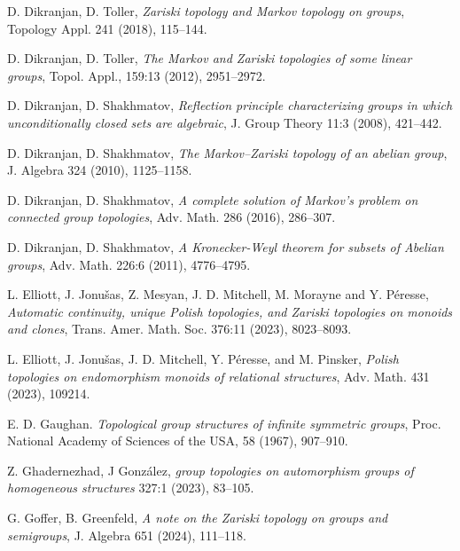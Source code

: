 \documentclass[11pt]{amsart}
\theoremstyle{definition}
\begin{document}
\begin{thebibliography}{}
D. Dikranjan, D. Toller, {\em Zariski topology and Markov topology on groups}, Topology Appl. 241 (2018), 115--144.

D. Dikranjan, D. Toller,
{\em The Markov and Zariski topologies of some linear groups},
Topol. Appl., 159:13 (2012), 2951--2972.

D. Dikranjan, D. Shakhmatov, {\em Reflection principle characterizing groups in which unconditionally closed sets are algebraic}, J. Group Theory 11:3 (2008), 421--442.

D. Dikranjan, D. Shakhmatov, {\em The Markov–Zariski topology of an abelian group},
J. Algebra 324 (2010), 1125--1158.


D. Dikranjan, D. Shakhmatov,
{\em A complete solution of Markov's problem on connected group topologies},
Adv. Math. 286 (2016), 286--307.

D. Dikranjan, D. Shakhmatov, 
{\em A Kronecker-Weyl theorem for subsets of Abelian groups},
Adv. Math. 226:6 (2011), 4776--4795.





L. Elliott, J. Jonu\v{s}as, Z. Mesyan, J. D. Mitchell, M. Morayne and Y. P\'eresse,
{\em Automatic continuity, unique Polish topologies, and Zariski topologies on monoids and clones}, Trans. Amer. Math. Soc. 376:11 (2023), 8023--8093.

L. Elliott, J. Jonu\v{s}as, J. D. Mitchell, Y. P\'{e}resse, and M. Pinsker, 
{\em Polish topologies on endomorphism monoids of relational structures}, Adv. Math. 431 (2023), 109214. 



E. D. Gaughan. {\em Topological group structures of infinite symmetric groups}, Proc. National Academy of Sciences of the USA, 58 (1967), 907--910.


Z. Ghadernezhad, J Gonz\'{a}lez,
{\em group topologies on automorphism groups of homogeneous structures} 327:1 (2023), 83--105.

G. Goffer, B. Greenfeld, {\em A note on the Zariski topology on groups and semigroups}, J. Algebra 651 (2024), 111--118.


\end{thebibliography}
\end{document}
